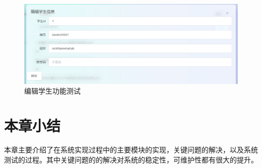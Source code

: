 \begin{figure}[htbp]
  \centering
  \includegraphics[scale = 0.6]{out/figure/测试/manage-edit-student-test.png}
  \caption{\song\wuhao 编辑学生功能测试}
  \label{manage-edit-student-test}
\end{figure}

\section{本章小结}

本章主要介绍了在系统实现过程中的主要模块的实现，关键问题的解决，以及系统测试的过程。其中关键问题的的解决对系统的稳定性，可维护性都有很大的提升。